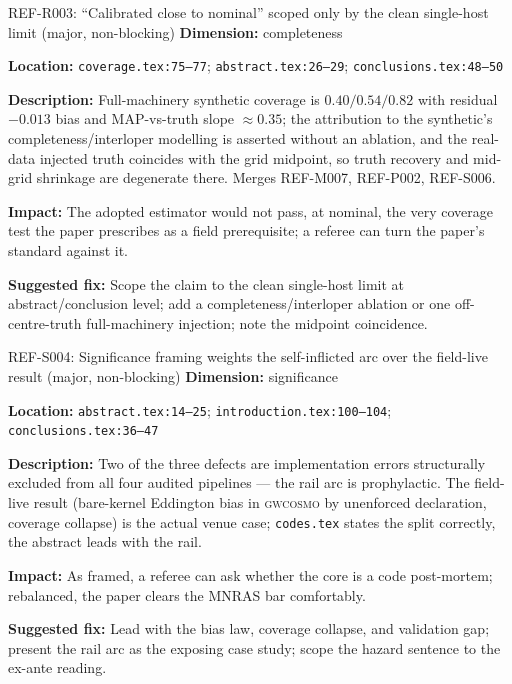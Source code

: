 \documentclass[11pt]{article}
\begin{document}
\begin{MajorIssueBox}{REF-R003: ``Calibrated close to nominal'' scoped only by the clean single-host limit (major, non-blocking)}
\textbf{Dimension:} completeness

\textbf{Location:} \texttt{coverage.tex:75--77}; \texttt{abstract.tex:26--29}; \texttt{conclusions.tex:48--50}

\textbf{Description:} Full-machinery synthetic coverage is $0.40/0.54/0.82$ with residual $-0.013$ bias and MAP-vs-truth slope $\approx 0.35$; the attribution to the synthetic's completeness/interloper modelling is asserted without an ablation, and the real-data injected truth coincides with the grid midpoint, so truth recovery and mid-grid shrinkage are degenerate there. Merges REF-M007, REF-P002, REF-S006.

\textbf{Impact:} The adopted estimator would not pass, at nominal, the very coverage test the paper prescribes as a field prerequisite; a referee can turn the paper's standard against it.

\textbf{Suggested fix:} Scope the claim to the clean single-host limit at abstract/conclusion level; add a completeness/interloper ablation or one off-centre-truth full-machinery injection; note the midpoint coincidence.
\end{MajorIssueBox}

\begin{MajorIssueBox}{REF-S004: Significance framing weights the self-inflicted arc over the field-live result (major, non-blocking)}
\textbf{Dimension:} significance

\textbf{Location:} \texttt{abstract.tex:14--25}; \texttt{introduction.tex:100--104}; \texttt{conclusions.tex:36--47}

\textbf{Description:} Two of the three defects are implementation errors structurally excluded from all four audited pipelines --- the rail arc is prophylactic. The field-live result (bare-kernel Eddington bias in \textsc{gwcosmo} by unenforced declaration, coverage collapse) is the actual venue case; \texttt{codes.tex} states the split correctly, the abstract leads with the rail.

\textbf{Impact:} As framed, a referee can ask whether the core is a code post-mortem; rebalanced, the paper clears the MNRAS bar comfortably.

\textbf{Suggested fix:} Lead with the bias law, coverage collapse, and validation gap; present the rail arc as the exposing case study; scope the hazard sentence to the ex-ante reading.
\end{MajorIssueBox}
\end{document}
